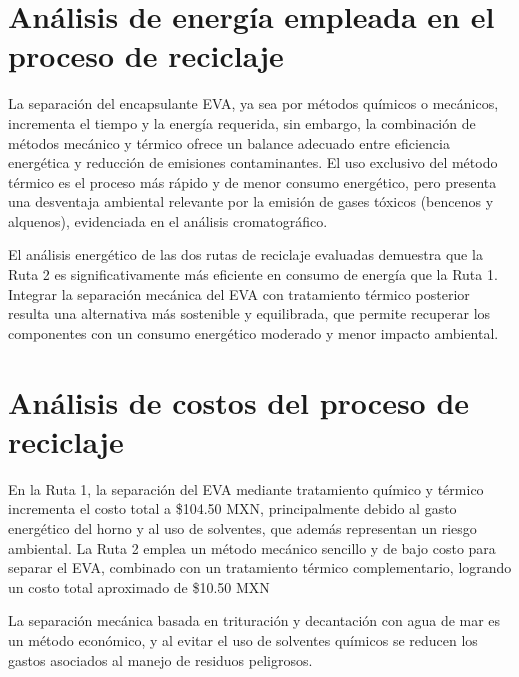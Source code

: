  \section{Análisis de energía empleada en el proceso de reciclaje}
 \label{sec:Conclusiones energia empleada}  
 
 La separación del encapsulante EVA, ya sea por métodos químicos o mecánicos, incrementa el tiempo y la energía requerida, sin embargo, la combinación de métodos mecánico y térmico ofrece un balance adecuado entre eficiencia energética y reducción de emisiones contaminantes. El uso exclusivo del método térmico es el proceso más rápido y de menor consumo energético, pero presenta una desventaja ambiental relevante por la emisión de gases tóxicos (bencenos y alquenos), evidenciada en el análisis cromatográfico.
 
 El análisis energético de las dos rutas de reciclaje evaluadas demuestra que la Ruta 2 es significativamente más eficiente en consumo de energía que la Ruta 1. Integrar la separación mecánica del EVA con tratamiento térmico posterior resulta una alternativa más sostenible y equilibrada, que permite recuperar los componentes con un consumo energético moderado y menor impacto ambiental.
 
 \section{Análisis de costos del proceso de reciclaje}
 \label{sec:Conclusiones costos del proceso}
 
 En la Ruta 1, la separación del EVA mediante tratamiento químico y térmico incrementa el costo total a \$104.50 MXN, principalmente debido al gasto energético del horno y al uso de solventes, que además representan un riesgo ambiental.
 La Ruta 2 emplea un método mecánico sencillo y de bajo costo para separar el EVA, combinado con un tratamiento térmico complementario, logrando un costo total aproximado de \$10.50 MXN
 
 La separación mecánica basada en trituración y decantación con agua de mar es un método económico, y al evitar el uso de solventes químicos se reducen los gastos asociados al manejo de residuos peligrosos.
 